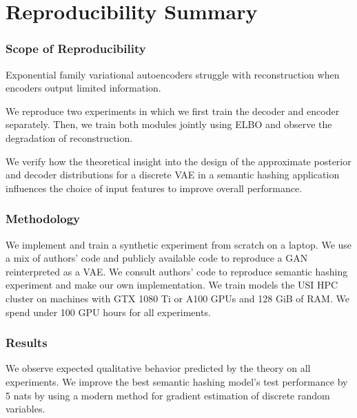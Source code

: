 \section*{\centering Reproducibility Summary}


\subsubsection*{Scope of Reproducibility}

Exponential family variational autoencoders struggle with reconstruction when encoders output limited information.

We reproduce two experiments in which we first train the decoder and encoder separately. Then, we train both modules jointly using ELBO and observe the degradation of reconstruction.

We verify how the theoretical insight into the design of the approximate posterior and decoder distributions for a discrete VAE in a semantic hashing application influences the choice of input features to improve overall performance.

\subsubsection*{Methodology}

We implement and train a synthetic experiment from scratch on a laptop. We use a mix of authors' code and publicly available code to reproduce a GAN reinterpreted as a VAE. We consult authors' code to reproduce semantic hashing experiment and make our own implementation. We train models the USI HPC cluster on machines with GTX 1080 Ti or A100 GPUs and 128 GiB of RAM. We spend under 100 GPU hours for all experiments.

\subsubsection*{Results}

We observe expected qualitative behavior predicted by the theory on all experiments. We improve the best semantic hashing model's test performance by 5 nats by using a modern method for gradient estimation of discrete random variables.

